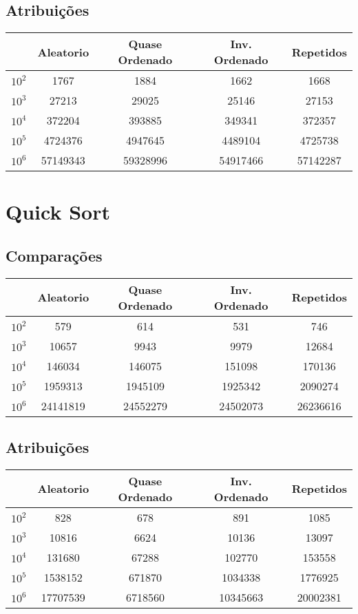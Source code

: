 \subsection{Atribuições}
\begin{tabular}{|c|c|c|c|c|}
\hline
  & Aleatorio & Quase Ordenado & Inv. Ordenado & Repetidos \\
  \hline
$10^2$ & 1767      & 1884           & 1662          & 1668      \\
\hline
$10^3$ & 27213     & 29025          & 25146         & 27153     \\
\hline
$10^4$ & 372204    & 393885         & 349341        & 372357    \\
\hline
$10^5$ & 4724376   & 4947645        & 4489104       & 4725738   \\
\hline
$10^6$ & 57149343  & 59328996       & 54917466      & 57142287 \\
\hline
\end{tabular}

\section{Quick Sort}
\label{sec:quick_sort}
\subsection{Comparações}
\begin{tabular}{|c|c|c|c|c|}
\hline
  & Aleatorio & Quase Ordenado & Inv. Ordenado & Repetidos \\
  \hline
$10^2$ & 579       & 614            & 531           & 746       \\
\hline
$10^3$ & 10657     & 9943           & 9979          & 12684     \\
\hline
$10^4$ & 146034    & 146075         & 151098        & 170136    \\
\hline
$10^5$ & 1959313   & 1945109        & 1925342       & 2090274   \\
\hline
$10^6$ & 24141819  & 24552279       & 24502073      & 26236616 \\
\hline
\end{tabular}
\subsection{Atribuições}
\begin{tabular}{|c|c|c|c|c|}
\hline
  & Aleatorio & Quase Ordenado & Inv. Ordenado & Repetidos \\
  \hline
$10^2$ & 828       & 678            & 891           & 1085      \\
\hline
$10^3$ & 10816     & 6624           & 10136         & 13097     \\
\hline
$10^4$ & 131680    & 67288          & 102770        & 153558    \\
\hline
$10^5$ & 1538152   & 671870         & 1034338       & 1776925   \\
\hline
$10^6$ & 17707539  & 6718560        & 10345663      & 20002381 \\
\hline
\end{tabular}
